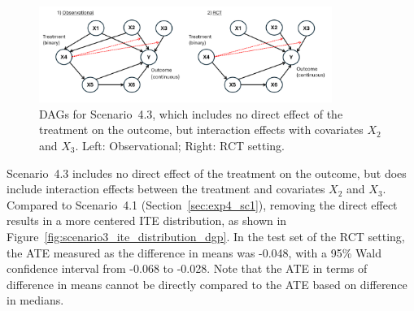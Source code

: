 \begin{figure}[H]
\centering
\includegraphics[width=0.85\textwidth]{img/exp4_dag_3.png}
\caption{DAGs for Scenario~4.3, which includes no direct effect of the treatment on the outcome, but interaction effects with covariates $X_2$ and $X_3$. Left: Observational; Right: RCT setting.}
\label{fig:ite_dag_observational_3}
\end{figure}

Scenario~4.3 includes no direct effect of the treatment on the outcome, but does include interaction effects between the treatment and covariates $X_2$ and $X_3$. Compared to Scenario~4.1 (Section~\ref{sec:exp4_sc1}), removing the direct effect results in a more centered ITE distribution, as shown in Figure~\ref{fig:scenario3_ite_distribution_dgp}. In the test set of the RCT setting, the ATE measured as the difference in means was -0.048, with a 95\% Wald confidence interval from -0.068 to -0.028. Note that the ATE in terms of difference in means cannot be directly compared to the ATE based on difference in medians.




